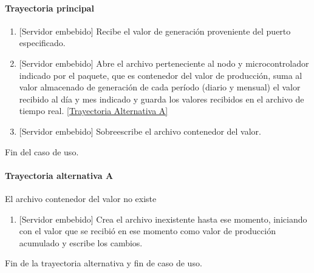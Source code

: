 \paragraph{Trayectoria principal}
\label{SUB-M-CU1.3:TP}
	\begin{enumerate}
		\item {[Servidor embebido]} Recibe el valor de generación proveniente del puerto especificado.
		
		\item {[Servidor embebido]} Abre el archivo perteneciente al nodo y microcontrolador indicado por el paquete, que es contenedor del valor de producción, suma al valor almacenado de generación de cada período (diario y mensual) el valor recibido al día y mes indicado y guarda los valores recibidos en el archivo de tiempo real.
		\hyperref[SUB-M-CU1.4:TA]{[Trayectoria Alternativa A]}
		
		\item {[Servidor embebido]}  Sobreescribe el archivo contenedor del valor.
	
	\end{enumerate}
	Fin del caso de uso.

\paragraph{Trayectoria alternativa A} \label{SUB-M-CU1.3:TA}
	El archivo contenedor del valor no existe
	\begin{enumerate}[label=A\arabic*.]
		\item {[Servidor embebido]} Crea el archivo inexistente hasta ese momento, iniciando con el valor que se recibió en ese momento como valor de producción acumulado y escribe los cambios.
	\end{enumerate}
	Fin de la trayectoria alternativa y fin de caso de uso.
